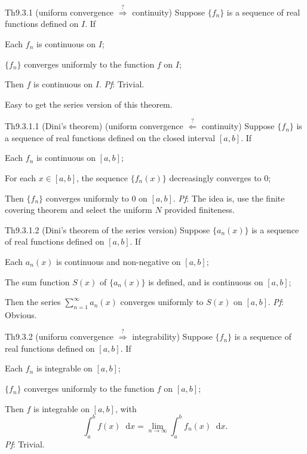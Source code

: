 \documentclass{article}
\newcommand{\dif}{\mathop{}\!\mathrm{d}}
\begin{document}
\begin{Th}{Th9.3.1 (uniform convergence $\overset{?}{\Rightarrow}$ continuity)}
    Suppose $\{f_n\}$ is a sequence of real functions defined on $I$. If
    \begin{compactenum}
        \item Each $f_n$ is continuous on $I$;
        \item $\{f_n\}$ converges uniformly to the function $f$ on $I$;
    \end{compactenum}
    Then $f$ is continuous on $I$.
    \tcblower
    \textit{Pf}: Trivial.
\end{Th}

\begin{Rmk}{}
    Easy to get the series version of this theorem.
\end{Rmk}

\begin{Th}{Th9.3.1.1 (Dini's theorem) (uniform convergence $\overset{?}{\Leftarrow}$ continuity)}
    Suppose $\{f_n\}$ is a sequence of real functions defined on the closed interval $[a,b]$. If
    \begin{compactenum}
        \item Each $f_n$ is continuous on $[a,b]$;
        \item For each $x\in [a,b]$, the sequence $\{f_n(x)\}$ decreasingly converges to $0$;
    \end{compactenum}
    Then $\{f_n\}$ converges uniformly to $0$ on $[a,b]$.
    \tcblower
    \textit{Pf}: The idea is, use the finite covering theorem and select the uniform $N$ provided finiteness.
\end{Th}

\begin{Th}{Th9.3.1.2 (Dini's theorem of the series version)}
    Suppose $\{a_n(x)\}$ is a sequence of real functions defined on $[a,b]$. If
    \begin{compactenum}
        \item Each $a_n(x)$ is continuous and non-negative on $[a,b]$;
        \item The sum function $S(x)$ of $\{a_n(x)\}$ is defined, and is continuous on $[a,b]$;
    \end{compactenum}
    Then the series $\sum_{n=1}^{\infty} a_n(x)$ converges uniformly to $S(x)$ on $[a,b]$.
    \tcblower
    \textit{Pf}: Obvious.
\end{Th}

\begin{Th}{Th9.3.2 (uniform convergence $\overset{?}{\Rightarrow}$ integrability)}
    Suppose $\{f_n\}$ is a sequence of real functions defined on $[a,b]$. If
    \begin{compactenum}
        \item Each $f_n$ is integrable on $[a,b]$;
        \item $\{f_n\}$ converges uniformly to the function $f$ on $[a,b]$;
    \end{compactenum}
    Then $f$ is integrable on $[a,b]$, with
    $$ \int_{a}^{b} f(x) \dif x = \lim_{n\to\infty} \int_{a}^{b} f_n(x) \dif x. $$
    \tcblower
    \textit{Pf}: Trivial.
\end{Th}
\end{document}
